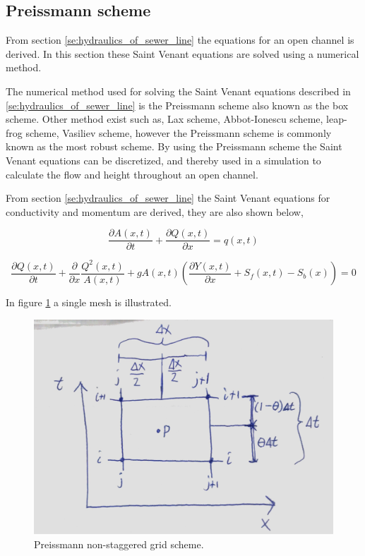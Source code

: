 ﻿\subsection{Preissmann scheme}\label{subse:preissmann_scheme}
From section \ref{se:hydraulics_of_sewer_line} the equations for an open channel is derived. In this section these Saint Venant equations are solved using a numerical method. 


The numerical method used for solving the Saint Venant equations described in \ref{se:hydraulics_of_sewer_line} is the Preissmann scheme also known as the box scheme. Other method exist such as, Lax scheme, Abbot-Ionescu scheme, leap-frog scheme, Vasiliev scheme, however the Preissmann scheme is commonly known as the most robust scheme. By using the Preissmann scheme the Saint Venant equations can be discretized, and thereby used in a simulation to calculate the flow and height throughout an open channel.   

From section \ref{se:hydraulics_of_sewer_line} the Saint Venant equations for conductivity and momentum are derived, they are also shown below,

\begin{equation}\label{eq:saintbernard_mass_preiss}
\frac{\partial A(x,t)}{\partial t} + \frac{\partial Q(x,t)}{\partial x}=q(x,t)
\end{equation}

\begin{equation}\label{eq:saintbernard_momentum_preiss}
	\frac{\partial Q(x,t)}{\partial t} + \frac{\partial}{\partial x} \frac{Q^2(x,t)}{A(x,t)}+ g A(x,t) (\frac{\partial Y(x,t)}{\partial x} +S_f(x,t)-S_b(x)) = 0
\end{equation}


In figure \ref{fig:preissmann_grid_scheme} a single mesh is illustrated.

\begin{figure}[H]
\centering
\includegraphics[width=.6\textwidth]{report/modeling/pictures/preissmann_scheme}
\caption{Preissmann non-staggered grid scheme.}
\label{fig:preissmann_grid_scheme}
\end{figure} 

